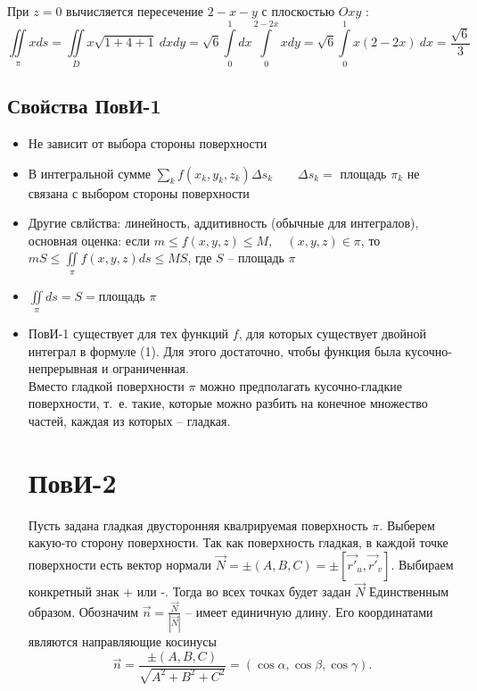 \documentclass[../../main.tex]{subfiles}
\begin{document}
\begin{exmps}
\begin{enumerate}
	При $z = 0$ вычисляется пересечение $2 -x-y$ с плоскостью $Oxy$ :
	\[\iint \limits_\pi x ds = \iint \limits_D x \sqrt{1 + 4 +1} \  dx dy = \sqrt{6}
	 \int \limits_0^1  dx \int \limits_0^{2 - 2x} x dy = \sqrt 6 \int \limits_0^1 
	 x(2 -2x) \ dx = \frac{\sqrt 6}{3}\] 
	 \end{enumerate}
	\end{exmps}
	\subsection{Свойства ПовИ-1}
	\begin{itemize}
		\item 	Не зависит от выбора стороны поверхности
		\item	В интегральной сумме $\sum\limits_{k} f(x_k, y_k, z_k) \Delta s_k
		 \qquad \Delta s_k = $ площадь $\pi_k$ не связана с выбором стороны поверхности
		\item Другие свлйства: линейность, аддитивность (обычные для интегралов),
		 основная оценка: если $m \leq f(x, y, z) \leq M, \quad (x, y, z) \in \pi$,
		  то $mS \leq \iint \limits_\pi f(x, y, z) ds \leq MS$, где $S$ \---
		   площадь $\pi$
		\item $\iint \limits_\pi ds  = S = $площадь $\pi$
		\item ПовИ-1 существует для тех функций $f$, для которых существует двойной
		 интеграл в формуле (1). Для этого достаточно, чтобы функция была
		  кусочно-непрерывная и ограниченная.\\
		Вместо гладкой поверхности $\pi$ можно предполагать кусочно-гладкие
		 поверхности, т.~е. такие, которые можно разбить на конечное множество
		  частей, каждая из которых \--- гладкая.\\
		\section{ПовИ-2}
		Пусть задана гладкая двусторонняя квалрируемая поверхность $\pi$. Выберем
		 какую-то сторону поверхности. Так как поверхность гладкая, в каждой точке
		  поверхности есть вектор нормали $\overrightarrow{N} = \pm (A, B,C) = \pm
		   [\overrightarrow{r'}_u, \overrightarrow{r'}_v]$. Выбираем конкретный
		    знак + или -. Тогда во всех точках будет задан $\overrightarrow{N}$
		     Единственным образом. Обозначим $\overrightarrow{n} =
		      \frac{\overrightarrow{N}}{|\overrightarrow{N}|}$ \--- имеет
		       единичную длину. Его координатами являются
		       направляющие косинусы
		\[\overrightarrow{n} = \frac{\pm(A,B,C)}{\sqrt{A^2 +B^2 + C^2}} = 
		(\cos \alpha, \cos \beta, \cos \gamma).\]

\end{itemize}
\end{document}
